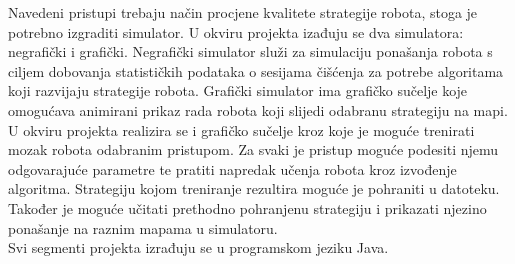 \documentclass[times, utf8, numeric]{fer}
\begin{document}
Navedeni pristupi trebaju način procjene kvalitete strategije robota, stoga je potrebno izgraditi simulator. U okviru projekta izađuju se dva simulatora: negrafički i grafički. Negrafički simulator služi za simulaciju ponašanja robota s ciljem dobovanja statističkih podataka o sesijama čišćenja za potrebe algoritama koji razvijaju strategije robota. Grafički simulator ima grafičko sučelje koje omogućava animirani prikaz rada robota koji slijedi odabranu strategiju na mapi.
\vspace{1ex}\\
U okviru projekta realizira se i grafičko sučelje kroz koje je moguće trenirati mozak robota odabranim pristupom. Za svaki je pristup moguće podesiti njemu odgovarajuće parametre te pratiti napredak učenja robota kroz izvođenje algoritma. Strategiju kojom treniranje rezultira moguće je pohraniti u datoteku. Također je moguće učitati prethodno pohranjenu strategiju i prikazati njezino ponašanje na raznim mapama u simulatoru.
\\
Svi segmenti projekta izrađuju se u programskom jeziku Java.



\end{document}
